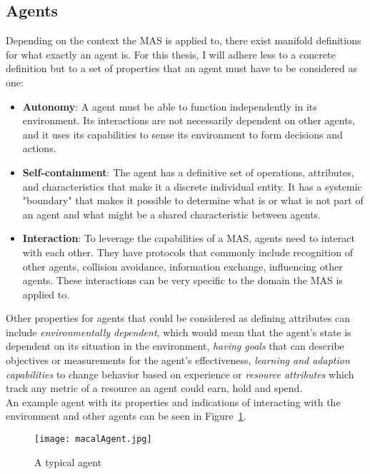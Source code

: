 \subsection{Agents}
Depending on the context the MAS is applied to, there exist manifold definitions for what exactly an agent is. For this thesis, I will adhere less to a concrete definition but to a set of properties that an agent must have to be considered as one:
\begin{itemize}
	\item \textbf{Autonomy}: A agent must be able to function independently in its environment. Its interactions are not necessarily dependent on other agents, and it uses its capabilities to sense its environment to form decisions and actions.
	\item \textbf{Self-containment}: The agent has a definitive set of operations, attributes, and characteristics that make it a discrete individual entity. It has a systemic "boundary" that makes it possible to determine what is or what is not part of an agent and what might be a shared characteristic between agents.
	\item \textbf{Interaction}: To leverage the capabilities of a MAS, agents need to interact with each other. They have protocols that commonly include recognition of other agents, collision avoidance, information exchange, influencing other agents. These interactions can be very specific to the domain the MAS is applied to.
\end{itemize}
Other properties for agents that could be considered as defining attributes can include \textit{environmentally dependent}, which would mean that the agent's state is dependent on its situation in the environment, \textit{having goals} that can describe objectives or measurements for the agent's effectiveness, \textit{learning and adaption capabilities} to change behavior based on experience or \textit{resource attributes} which track any metric of a resource an agent could earn, hold and spend.~\cite{Macal2009}\\
An example agent with its properties and indications of interacting with the environment and other agents can be seen in Figure~\ref{fig:macalAgent}.
\begin{figure}
	\centering
	\texttt{[image: macalAgent.jpg]}
	\caption{A typical agent~\cite{Macal2009}}
	\label{fig:macalAgent}
\end{figure}
